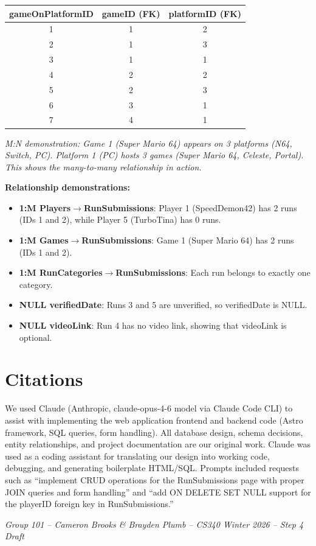 \documentclass[11pt]{article}
\begin{document}
\begin{center}
\begin{tabular}{ccc}
\toprule
\textbf{gameOnPlatformID} & \textbf{gameID (FK)} & \textbf{platformID (FK)} \\
\midrule
1 & 1 & 2 \\
2 & 1 & 3 \\
3 & 1 & 1 \\
4 & 2 & 2 \\
5 & 2 & 3 \\
6 & 3 & 1 \\
7 & 4 & 1 \\
\bottomrule
\end{tabular}
\end{center}

\textit{M:N demonstration: Game 1 (Super Mario 64) appears on 3 platforms (N64, Switch, PC). Platform 1 (PC) hosts 3 games (Super Mario 64, Celeste, Portal). This shows the many-to-many relationship in action.}

\textbf{Relationship demonstrations:}
\begin{itemize}[leftmargin=2em]
    \item \textbf{1:M Players$\rightarrow$RunSubmissions}: Player 1 (SpeedDemon42) has 2 runs (IDs 1 and 2), while Player 5 (TurboTina) has 0 runs.
    \item \textbf{1:M Games$\rightarrow$RunSubmissions}: Game 1 (Super Mario 64) has 2 runs (IDs 1 and 2).
    \item \textbf{1:M RunCategories$\rightarrow$RunSubmissions}: Each run belongs to exactly one category.
    \item \textbf{NULL verifiedDate}: Runs 3 and 5 are unverified, so verifiedDate is NULL.
    \item \textbf{NULL videoLink}: Run 4 has no video link, showing that videoLink is optional.
\end{itemize}

\hrulefill

\section*{Citations}

We used Claude (Anthropic, claude-opus-4-6 model via Claude Code CLI) to assist with implementing the web application frontend and backend code (Astro framework, SQL queries, form handling). All database design, schema decisions, entity relationships, and project documentation are our original work. Claude was used as a coding assistant for translating our design into working code, debugging, and generating boilerplate HTML/SQL. Prompts included requests such as ``implement CRUD operations for the RunSubmissions page with proper JOIN queries and form handling'' and ``add ON DELETE SET NULL support for the playerID foreign key in RunSubmissions.''

\vfill
\begin{center}
\textit{Group 101 -- Cameron Brooks \& Brayden Plumb -- CS340 Winter 2026 -- Step 4 Draft}
\end{center}
\end{document}
